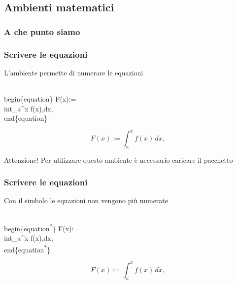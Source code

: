 \documentclass[svgnames,%
	ucs,%
	pdftex]{guitbeamer}
\begin{document}
\subsection{Ambienti matematici}
\begin{frame}
  \frametitle{A che punto siamo}
\end{frame}
\begin{frame}
  \frametitle{Scrivere le equazioni}
	L'ambiente  permette di numerare le equazioni
	\begin{LaTeXcode}
		\alert{\\begin\{equation\}}\n
		\hspace*{5ex} F(x):= \\int\_a\textasciicircum x f(x)\bs,dx,\n
		\alert{\\end\{equation\}}
	\end{LaTeXcode}
	\begin{LaTeXoutput}
		\begin{equation}
			F(x):= \int_a^x f(x)\,dx,
		\end{equation}
	\end{LaTeXoutput}
	\begin{block}{Attenzione!}
		Per utilizzare questo ambiente \`e necessario caricare il pacchetto \Lsty{amsmath}
	\end{block}
\end{frame}
\begin{frame}
  \frametitle{Scrivere le equazioni}
	Con il simbolo \LCmd[]{\textsuperscript{*}} le equazioni non vengono pi\`u numerate
	\begin{LaTeXcode}
		\\begin\{equation\alert{\textsuperscript{*}}\}\n
		\hspace*{5ex} F(x):= \\int\_a\textasciicircum x f(x)\bs,dx,\n
		\\end\{equation\alert{\textsuperscript{*}}\}
	\end{LaTeXcode}
	\begin{LaTeXoutput}
		\begin{equation*}
			F(x):= \int_a^x f(x)\,dx,
		\end{equation*}
	\end{LaTeXoutput}
\end{frame}
\end{document}
